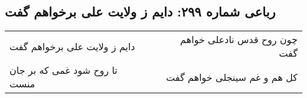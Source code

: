 \begin{center}
\section*{رباعی شماره ۲۹۹: دایم ز ولایت علی برخواهم گفت}
\label{sec:0299}
\begin{longtable}{l p{0.5cm} r}
دایم ز ولایت علی برخواهم گفت
&&
چون روح قدس نادعلی خواهم گفت
\\
تا روح شود غمی که بر جان منست
&&
کل هم و غم سینجلی خواهم گفت
\\
\end{longtable}
\end{center}
